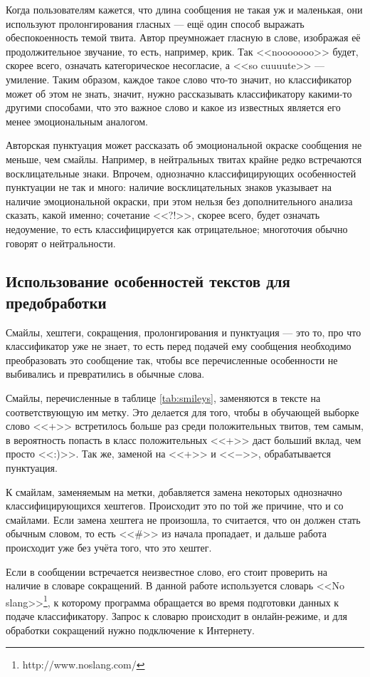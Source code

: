 Когда пользователям кажется, что длина сообщения не такая уж и маленькая, они используют
пролонгирования гласных --- ещё один способ выражать обеспокоенность темой твита. Автор преумножает
гласную в слове, изображая её продолжительное звучание, то есть, например, крик. Так <<nooooooo>>
будет, скорее всего, означать категорическое несогласие, а <<so cuuuute>> --- умиление. Таким
образом, каждое такое слово что-то значит, но классификатор может об этом не знать, значит, нужно
рассказывать классификатору какими-то другими способами, что это важное слово и какое из известных
является его менее эмоциональным аналогом.

Авторская пунктуация может рассказать об эмоциональной окраске сообщения не меньше, чем
смайлы. Например, в нейтральных твитах крайне редко встречаются восклицательные знаки. Впрочем,
однозначно классифицирующих особенностей пунктуации не так и много: наличие восклицательных знаков
указывает на наличие эмоциональной окраски, при этом нельзя без дополнительного анализа сказать,
какой именно; сочетание <<?!>>, скорее всего, будет означать недоумение, то есть классифицируется
как отрицательное; многоточия обычно говорят о нейтральности.

\subsection{Использование особенностей текстов для предобработки}\label{spec}
Смайлы, хештеги, сокращения, пролонгирования и пунктуация --- это то, про что классификатор уже не
знает, то есть перед подачей ему сообщения необходимо преобразовать это сообщение так, чтобы все
перечисленные особенности не выбивались и превратились в обычные слова.

Смайлы, перечисленные в таблице \ref{tab:smileys}, заменяются в тексте на соответствующую им
метку. Это делается для того, чтобы в обучающей выборке слово <<+>> встретилось больше раз среди
положительных твитов, тем самым, в вероятность попасть в класс положительных <<+>> даст больший
вклад, чем  просто <<:)>>. Так же, заменой на <<+>> и <<$\minus$>>, обрабатывается пунктуация.

К смайлам, заменяемым на метки, добавляется замена некоторых однозначно классифицирующихся
хештегов. Происходит это по той же причине, что и со смайлами. Если замена хештега не произошла, то
считается, что он должен стать обычным словом, то есть <<\#>> из начала пропадает, и дальше работа
происходит уже без учёта того, что это хештег.

Если в сообщении встречается неизвестное слово, его стоит проверить на наличие в словаре сокращений. В данной
работе используется словарь <<No slang>>\footnote{http://www.noslang.com/}, к которому программа
обращается во время подготовки данных к подаче классификатору. Запрос к словарю происходит в
онлайн-режиме, и для обработки сокращений нужно подключение к Интернету.

